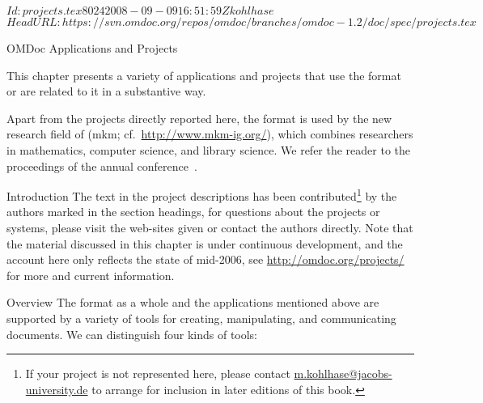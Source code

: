 \svnInfo $Id: projects.tex 8024 2008-09-09 16:51:59Z kohlhase $
\svnKeyword $HeadURL: https://svn.omdoc.org/repos/omdoc/branches/omdoc-1.2/doc/spec/projects.tex $

\begin{tchapter}[id=projects,short=Applications and Projects]{OMDoc Applications and Projects}

  This chapter presents a variety of applications and projects that use the {\omdoc}
  format or are related to it in a substantive way.  

  Apart from the projects directly reported here, the {\omdoc} format is used by the new
  research field of {} ({\sc mkm};
  cf.~\url{http://www.mkm-ig.org/}), which combines researchers in mathematics, computer
  science, and library science. We refer the reader to the proceedings of the annual
  {} conference~\cite{MKM01,MKM03,MKM04,MKM05,MKM06}.


\begin{tsection}[id=projeccts-intro]{Introduction}
  The text in the project descriptions has been contributed\footnote{If your {\omdoc}
    project is not represented here, please contact \url{m.kohlhase@jacobs-university.de} to arrange
    for inclusion in later editions of this book.} by the authors marked in the section
  headings, for questions about the projects or systems, please visit the web-sites given
  or contact the authors directly. Note that the material discussed in this chapter is
  under continuous development, and the account here only reflects the state of mid-2006,
  see \url{http://omdoc.org/projects/} for more and current information.


\begin{tsubsection}[id=projects-overview]{Overview}
  The {\omdoc} format as a whole and the applications mentioned above are supported by a
  variety of tools for creating, manipulating, and communicating {\omdoc} documents. We
  can distinguish four kinds of tools:


\end{tsubsection}
\end{tsection}
\end{tchapter}
